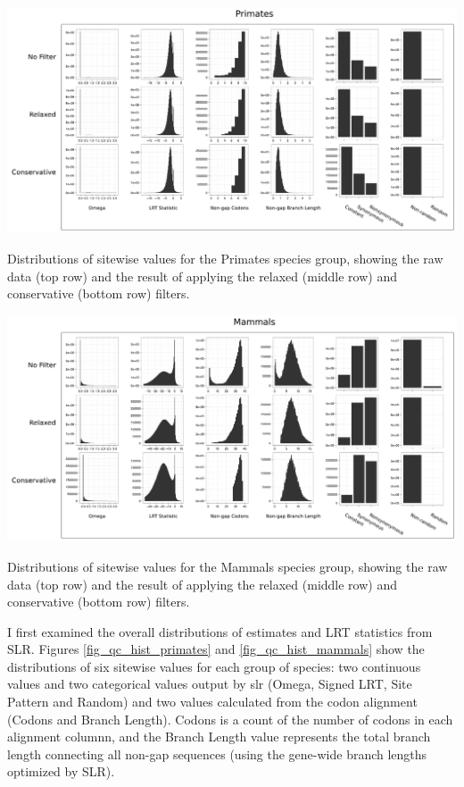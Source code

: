 \bbfig
\centering
\includegraphics[scale=0.42]{Figs/qc_hist_primates.pdf}
\caption{Distributions of sitewise values for the Primates species
  group, showing the raw data (top row) and the result of applying the
  relaxed (middle row) and conservative (bottom row) filters.}
\label{fig_qc_hist_primates}
\eefig

\bbfig
\centering
\includegraphics[scale=0.42]{Figs/qc_hist_mammals.pdf}
\caption{Distributions of sitewise values for the Mammals species
  group, showing the raw data (top row) and the result of applying the
  relaxed (middle row) and conservative (bottom row) filters.}
\label{fig_qc_hist_mammals}
\eefig
 
I first examined the overall distributions of \omg estimates and \sw
LRT statistics from SLR. Figures \ref{fig_qc_hist_primates} and
\ref{fig_qc_hist_mammals} show the distributions of six sitewise values
for each group of species: two continuous values and two categorical
values output by \ac{slr} (Omega, Signed LRT, Site Pattern and Random)
and two values calculated from the codon alignment (\Ngap Codons and
\Ngap Branch Length). \Ngap Codons is a count of the number of \ngap
codons in each alignment columnn, and the \Ngap Branch Length value
represents the total branch length connecting all non-gap sequences
(using the gene-wide branch lengths optimized by SLR).

